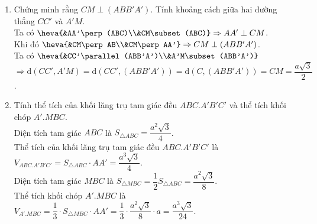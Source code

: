 \begin{bt}
{\begin{enumerate}
			Vậy $\mathrm{d}(CC',(ABB'A'))=\mathrm{d}(C,(ABB'A'))=CM=\dfrac{a\sqrt{3}}{2}$.
			\item Chứng minh rằng $CM\perp (ABB'A')$. Tính khoảng cách giữa hai đường thẳng $CC'$ và $A'M$.\\
			Ta có $\heva{&AA'\perp (ABC)\\&CM\subset (ABC)}\Rightarrow AA'\perp CM$.\\
			Khi đó $\heva{&CM\perp AB\\&CM\perp AA'}\Rightarrow CM\perp (ABB'A')$.\\
			Ta có $\heva{&CC'\parallel (ABB'A')\\&A'M\subset (ABB'A')}$\\
			$\Rightarrow \mathrm{d}(CC',A'M)=\mathrm{d}(CC',(ABB'A'))=\mathrm{d}(C,(ABB'A'))=CM=\dfrac{a\sqrt{3}}{2}$.
			\item Tính thể tích của khối lăng trụ tam giác đều $ABC.A'B'C'$ và thể tích khối chóp $A'.MBC$.\\
			Diện tích tam giác $ABC$ là $S_{\triangle {ABC}}=\dfrac{a^2\sqrt{3}}{4}$.\\
			Thể tích của khối lăng trụ tam giác đều $ABC.A'B'C'$ là $V_{ABC.A'B'C'}=S_{\triangle {ABC}}\cdot AA'=\dfrac{a^3\sqrt{3}}{4}$.\\
			Diện tích tam giác $MBC$ là $S_{\triangle {MBC}}=\dfrac{1}{2}S_{\triangle{ABC}}=\dfrac{a^2\sqrt{3}}{8}$.\\
			Thể tích khối chóp $A'.MBC$ là $V_{A'.MBC}=\dfrac{1}{3}\cdot S_{\triangle{MBC}}\cdot AA'=\dfrac{1}{3}\cdot \dfrac{a^2\sqrt{3}}{8}\cdot a=\dfrac{a^3\sqrt{3}}{24}$.
		\end{enumerate}
	}
\end{bt}

